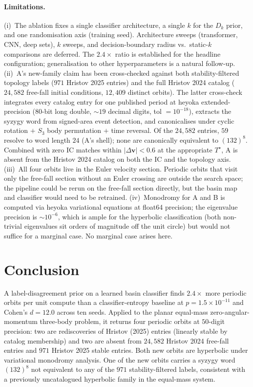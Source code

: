 \documentclass[10pt]{article}
\newcommand{\vvec}{\mathbf{v}}
\newcommand{\Tstar}{T^{\star}}
\begin{document}
\paragraph{Limitations.}
(i)~The ablation fixes a single classifier architecture, a single
$k$ for the $D_k$ prior, and one randomisation axis (training seed).
Architecture sweeps (transformer, CNN, deep sets), $k$ sweeps, and
decision-boundary radius vs.\ static-$k$ comparisons are deferred.
The $2.4\times$ ratio is established for the headline configuration;
generalisation to other hyperparameters is a natural follow-up.
(ii)~A's new-family claim has been cross-checked against both
stability-filtered topology labels ($971$ Hristov 2025 entries) and
the full Hristov 2024 catalog ($24{,}582$ free-fall initial
conditions, $12{,}409$ distinct orbits). The latter cross-check
integrates every catalog entry for one published period at heyoka
extended-precision ($80$-bit long double, $\sim\!19$ decimal digits,
tol $= 10^{-18}$), extracts the syzygy word from signed-area event
detection, and canonicalises under cyclic rotation $+$ $S_3$ body
permutation $+$ time reversal. Of the $24{,}582$ entries, $59$
resolve to word length $24$ (A's shell); none are canonically
equivalent to $(132)^{8}$. Combined with zero IC matches within
$|\Delta \vvec| < 0.6$ at the appropriate $\Tstar$, A is absent from
the Hristov 2024 catalog on both the IC and the topology axis.
(iii)~All four orbits live in the Euler velocity section. Periodic
orbits that visit only the free-fall section without an Euler
crossing are outside the search space; the pipeline could be rerun on
the free-fall section directly, but the basin map and classifier
would need to be retrained.
(iv)~Monodromy for A and B is computed via heyoka variational
equations at float64 precision; the eigenvalue precision is
$\sim\!10^{-6}$, which is ample for the hyperbolic classification
(both non-trivial eigenvalues sit orders of magnitude off the unit
circle) but would not suffice for a marginal case. No marginal case
arises here.

\section{Conclusion}

A label-disagreement prior on a learned basin classifier finds
$2.4\times$ more periodic orbits per unit compute than a
classifier-entropy baseline at $p = 1.5 \times 10^{-11}$ and Cohen's
$d = 12.0$ across ten seeds. Applied to the planar equal-mass
zero-angular-momentum three-body problem, it returns four periodic
orbits at $50$-digit precision: two are rediscoveries of Hristov
(2025) entries (linearly stable by catalog membership) and two are
absent from $24{,}582$ Hristov 2024 free-fall entries and $971$
Hristov 2025 stable entries. Both new orbits are hyperbolic under
variational monodromy analysis. One of the new orbits carries a
syzygy word $(132)^{8}$ not equivalent to any of the $971$
stability-filtered labels, consistent with a previously uncatalogued
hyperbolic family in the equal-mass system.
\end{document}
